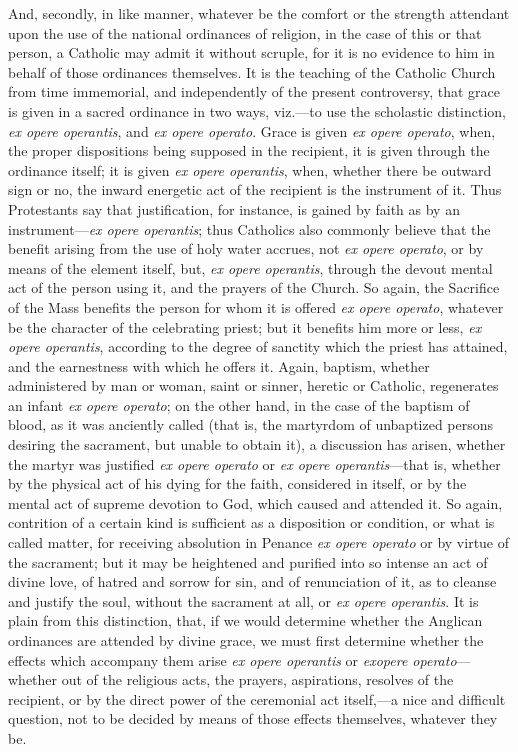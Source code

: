 And, secondly, in like manner, whatever be the comfort or the
strength attendant upon the use of the national ordinances of
religion, in the case of this or that person, a Catholic may admit it
without scruple, for it is no evidence to him in behalf of those
ordinances themselves. It is the teaching of the Catholic Church from
time immemorial, and independently of the present controversy, that
grace is given in a sacred ordinance in two ways, viz.—to use the
scholastic distinction, \emph{ex opere operantis}, and \emph{ex opere
operato}. Grace is given \emph{ex opere operato}, when, the proper
dispositions being supposed in the recipient, it is given through the
ordinance itself; it is given \emph{ex opere operantis}, when, whether
there be outward sign or no, the inward energetic act of the recipient
is the instrument of it. Thus Protestants say that justification, for
instance, is gained by faith as by an instrument—\emph{ex opere
operantis}; thus Catholics also commonly believe that the benefit
arising from the use of holy water accrues, not \emph{ex opere operato},
or by means of the element itself, but, \emph{ex opere operantis},
through the devout mental act of the person using it, and the prayers
of the Church. So again, the Sacrifice of the Mass benefits the person
for whom it is offered \emph{ex opere operato}, whatever be the
character of the celebrating priest; but it benefits him more or less,
\emph{ex opere operantis}, according to the degree of sanctity which
the priest has attained, and the earnestness with which he offers it.
Again, baptism, whether administered by man or woman, saint or sinner,
heretic or Catholic, regenerates an infant \emph{ex opere operato}; on
the other hand, in the case of the baptism of blood, as it was
anciently called (that is, the martyrdom of unbaptized persons
desiring the sacrament, but unable to obtain it), a discussion has
arisen, whether the martyr was justified \emph{ex opere operato} or \emph{ex
opere operantis}—that is, whether by the physical act of his
dying for the faith, considered in itself, or by the mental act of
supreme devotion to God, which caused and attended it. So again,
contrition of a certain kind is sufficient as a disposition or
condition, or what is called matter, for receiving absolution in
Penance \emph{ex opere operato} or by virtue of the sacrament; but it
may be heightened and purified into so intense an act of divine love,
of hatred and sorrow for sin, and of renunciation of it, as to cleanse
and justify the soul, without the sacrament at all, or \emph{ex opere
operantis}. It is plain from this distinction, that, if we would
determine whether the Anglican ordinances are attended by divine
grace, we must first determine whether the effects which accompany
them arise \emph{ex opere operantis} or \emph{ex}\emph{opere operato}—whether
out of the religious acts, the prayers, aspirations, resolves of the
recipient, or by the direct power of the ceremonial act itself,—a
nice and difficult question, not to be decided by means of those
effects themselves, whatever they be.

